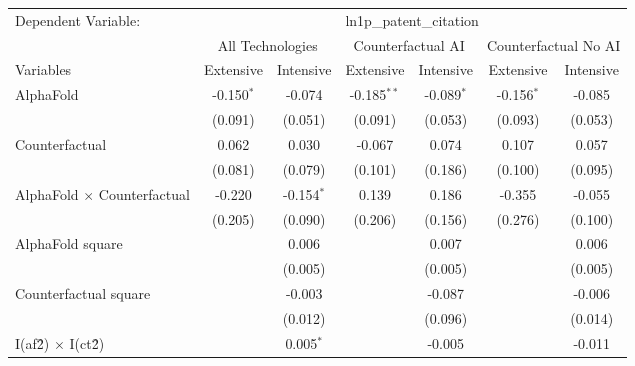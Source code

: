 \begingroup
\centering
\begin{tabular}{lcccccc}
   \tabularnewline \midrule \midrule
   Dependent Variable: & \multicolumn{6}{c}{ln1p\_patent\_citation}\\
 & \multicolumn{2}{c}{All Technologies} & \multicolumn{2}{c}{Counterfactual AI} & \multicolumn{2}{c}{Counterfactual No AI} \\
\cmidrule(lr){1-1}\cmidrule(lr){2-3} \cmidrule(lr){4-5} \cmidrule(lr){6-7}
Variables & \multicolumn{1}{c}{Extensive} & \multicolumn{1}{c}{Intensive} & \multicolumn{1}{c}{Extensive} & \multicolumn{1}{c}{Intensive} & \multicolumn{1}{c}{Extensive} & \multicolumn{1}{c}{Intensive} \\
\cmidrule(lr){1-1}\cmidrule(lr){2-2} \cmidrule(lr){3-3} \cmidrule(lr){4-4} \cmidrule(lr){5-5} \cmidrule(lr){6-6} \cmidrule(lr){7-7}
   AlphaFold                          & -0.150$^{*}$ & -0.074       & -0.185$^{**}$ & -0.089$^{*}$ & -0.156$^{*}$ & -0.085\\   
                                      & (0.091)      & (0.051)      & (0.091)       & (0.053)      & (0.093)      & (0.053)\\   
   Counterfactual                     & 0.062        & 0.030        & -0.067        & 0.074        & 0.107        & 0.057\\   
                                      & (0.081)      & (0.079)      & (0.101)       & (0.186)      & (0.100)      & (0.095)\\   
   AlphaFold $\times$ Counterfactual  & -0.220       & -0.154$^{*}$ & 0.139         & 0.186        & -0.355       & -0.055\\   
                                      & (0.205)      & (0.090)      & (0.206)       & (0.156)      & (0.276)      & (0.100)\\   
   AlphaFold square                   &              & 0.006        &               & 0.007        &              & 0.006\\   
                                      &              & (0.005)      &               & (0.005)      &              & (0.005)\\   
   Counterfactual square              &              & -0.003       &               & -0.087       &              & -0.006\\   
                                      &              & (0.012)      &               & (0.096)      &              & (0.014)\\   
   I(af\^2) $\times$ I(ct\^2)         &              & 0.005$^{*}$  &               & -0.005       &              & -0.011\\   

\end{tabular}
